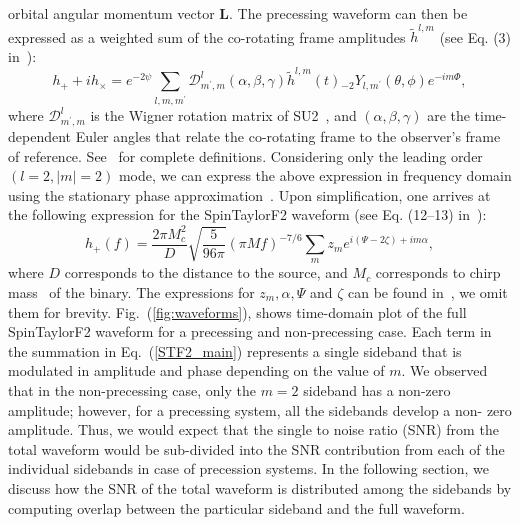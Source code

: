 orbital angular momentum vector $\mathbf{L}$. The precessing waveform can then
be expressed as a weighted sum of the co-rotating frame amplitudes
$\tilde{h}^{l,m}$ (see Eq. (3) in~\cite{Lundgren2014}):
\begin{equation}   
h_{+} + i h_{\times} = e^{-2 \psi}
\sum_{l,m,m^{\prime}} \mathcal{D}^{l}_{m^{\prime},m} \left(\alpha, \beta, \gamma\right)
\tilde{h}^{l,m}(t){}_{-2}Y_{l,m^{\prime}}\left(\theta,\phi\right)e^{-i m \Phi},
\end{equation}   
where $\mathcal{D}^{l}_{m^{\prime},m}$ is the Wigner rotation matrix of
SU2~\cite{Boyle2011}, and $(\alpha, \beta, \gamma)$ are the time- dependent
Euler angles that relate the co-rotating frame to the observer's frame of
reference. See~\cite{Lundgren2014} for complete definitions. Considering only
the leading order $(l=2, |m| = 2)$ mode, we can express the above expression in
frequency domain using the stationary phase approximation~\cite{Lundgren2014,
Creighton}.  Upon simplification, one arrives at the following expression for
the SpinTaylorF2 waveform (see Eq. (12--13) in~\cite{Lundgren2014}):
\begin{equation}  
\label{STF2_main} 
h_{+}(f) =
\dfrac{2\pi M_{c}^{2}}{D}\sqrt{\dfrac{5}{96\pi}}(\pi M
f)^{-7/6}\sum_{m}z_{m}e^{i(\Psi - 2\zeta) + i m \alpha},
\end{equation} 
where $D$ corresponds to the distance to the source, and $M_{c}$ corresponds to
chirp mass~\cite{Creighton} of the binary. The expressions for $z_{m}, \alpha,
\Psi$ and $\zeta$  can be found in~\cite{Lundgren2014}, we omit them for
brevity. Fig.~(\ref{fig:waveforms}), shows  time-domain plot of the full
SpinTaylorF2 waveform for a precessing and non-precessing case. Each term in the
summation in Eq.~(\ref{STF2_main}) represents a single sideband that is
modulated in amplitude and phase depending on the value of $m$.  We observed
that in  the non-precessing case, only the $m=2$ sideband has a non-zero
amplitude; however, for a precessing system, all the sidebands develop a non-
zero amplitude. Thus, we would expect that the single to noise ratio (SNR) from
the total waveform would be sub-divided into the SNR contribution from each of
the individual sidebands in case of precession systems. In the following section, 
we discuss how the SNR of the total waveform is distributed among the sidebands
by computing overlap between the particular sideband and the full waveform.

